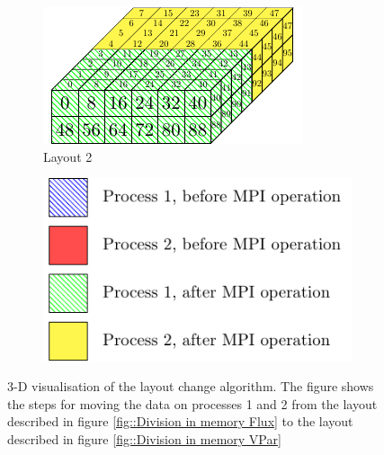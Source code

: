 \begin{figure}[p]
\begin{center}
 \begin{subfigure}[t]{0.45\textwidth}
  \centering
  \includegraphics[width=\textwidth]{Figs/SplitConcat3D/Layout2}
  \caption{\label{fig::3DSplitConcat layout2} Layout 2}
 \end{subfigure}
 \hspace{0.05\textwidth}
 \begin{subfigure}[t]{0.45\textwidth}
  \centering
  \includegraphics[width=.9\textwidth]{Figs/SplitConcat3D/Legend}
 \end{subfigure}
  \caption{\label{fig::3D layout change} 3-D visualisation of the layout change algorithm. The figure shows the steps for moving the data on processes 1 and 2 from the layout described in figure \ref{fig::Division in memory Flux} to the layout described in figure \ref{fig::Division in memory VPar}}
 \end{center}
\end{figure}

